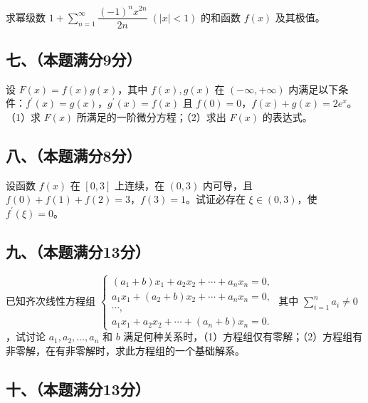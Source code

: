 \documentclass[UTF8,12pt]{ctexart}
\begin{document}
求幂级数 \(\displaystyle 1+\displaystyle \sum_{n=1}^{\infty}\dfrac{\displaystyle (-1)^nx^{2n}}{\displaystyle 2n}\;(|x|<1)\) 的和函数 \(\displaystyle f(x)\) 及其极值。


\subsection*{七、（本题满分9分）}

设 \(\displaystyle F(x)=f(x)g(x)\)，其中 \(\displaystyle f(x),\allowbreak g(x)\) 在 \(\displaystyle (-\infty,\allowbreak +\infty)\) 内满足以下条件：\(\displaystyle f^{\prime}(x)=g(x)\)，\(\displaystyle g^{\prime}(x)=f(x)\) 且 \(\displaystyle f(0)=0\)，\(\displaystyle f(x)+g(x)=2e^x\)。（1）求 \(\displaystyle F(x)\) 所满足的一阶微分方程；（2）求出 \(\displaystyle F(x)\) 的表达式。


\subsection*{八、（本题满分8分）}

设函数 \(\displaystyle f(x)\) 在 \(\displaystyle [0,\allowbreak 3]\) 上连续，在 \(\displaystyle (0,\allowbreak 3)\) 内可导，且 \(\displaystyle f(0)+f(1)+f(2)=3\)，\(\displaystyle f(3)=1\)。试证必存在 \(\displaystyle \xi\in(0,\allowbreak 3)\)，使 \(\displaystyle f^{\prime}(\xi)=0\)。


\subsection*{九、（本题满分13分）}

已知齐次线性方程组 \(\displaystyle \begin{cases}(a_1+b)x_1+a_2x_2+\cdots+a_nx_n=0,\allowbreak \\a_1x_1+(a_2+b)x_2+\cdots+a_nx_n=0,\allowbreak \\\cdots,\allowbreak \\a_1x_1+a_2x_2+\cdots+(a_n+b)x_n=0.\end{cases}\) 其中 \(\displaystyle \sum_{i=1}^na_i\ne0\)，试讨论 \(\displaystyle a_1,\allowbreak a_2,\allowbreak \ldots,\allowbreak a_n\) 和 \(\displaystyle b\) 满足何种关系时，（1）方程组仅有零解；（2）方程组有非零解，在有非零解时，求此方程组的一个基础解系。


\subsection*{十、（本题满分13分）}
\end{document}
